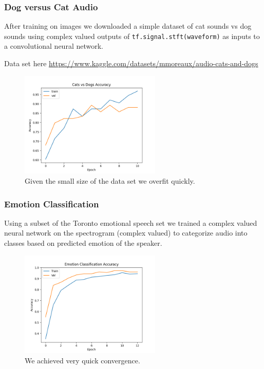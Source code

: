 \documentclass{article}
\let\citep\parencite   %
\begin{document}
\subsubsection{Dog versus Cat Audio}
After training on images we downloaded a simple dataset of cat sounds vs dog sounds using complex valued outputs of \texttt{tf.signal.stft(waveform)} as inputs to a convolutional neural network.

 Data set here \url{https://www.kaggle.com/datasets/mmoreaux/audio-cats-and-dogs}
\begin{figure}[H]
  \centering
  \includegraphics[width=0.6\textwidth]{../figs/cats_dogs_accuracy.png}
  \caption{Given the small size of the data set we overfit quickly.}
\end{figure}
\newpage
\subsubsection{Emotion Classification}
Using a subset of the Toronto emotional speech set \citep{TESS} we trained a complex valued neural network on the spectrogram (complex valued) to categorize audio into classes based on predicted emotion of the speaker.

\begin{figure}[H]
  \centering
  \includegraphics[width=0.6\textwidth]{../figs/emotion_accuracy.png}
  \caption{We achieved very quick convergence.}
\end{figure}
\end{document}
